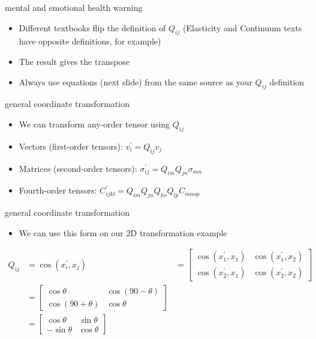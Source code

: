 \documentclass[
  letterpaper,
  ignorenonframetext,
  aspectratio=43,
  handout,
  12pt]{beamer}
\providecommand{\tightlist}{%
  \setlength{\itemsep}{0pt}\setlength{\parskip}{0pt}}
\providecommand{\tightlist}{%
\setlength{\itemsep}{0pt}\setlength{\parskip}{0pt}}
\begin{document}
\begin{frame}{mental and emotional health warning}
\protect\hypertarget{mental-and-emotional-health-warning}{}
\begin{itemize}
\tightlist
\item
  Different textbooks flip the definition of \(Q_{ij}\) (Elasticity and
  Continuum texts have opposite definitions, for example)
\item
  The result gives the transpose
\item
  Always use equations (next slide) from the same source as your
  \(Q_{ij}\) definition
\end{itemize}
\end{frame}

\begin{frame}{general coordinate transformation}
\protect\hypertarget{general-coordinate-transformation-1}{}
\begin{itemize}
\tightlist
\item
  We can transform any-order tensor using \(Q_{ij}\)
\item
  Vectors (first-order tensors): \(v_i^\prime = Q_{ij} v_j\)
\item
  Matrices (second-order tensors):
  \(\sigma_{ij}^\prime = Q_{im}Q_{jn} \sigma_{mn}\)
\item
  Fourth-order tensors:
  \(C_{ijkl}^\prime = Q_{im}Q_{jn}Q_{ko}Q_{lp} C_{mnop}\)
\end{itemize}
\end{frame}

\begin{frame}{general coordinate transformation}
\protect\hypertarget{general-coordinate-transformation-2}{}
\begin{itemize}
\tightlist
\item
  We can use this form on our 2D transformation example
\end{itemize}

\[\begin{aligned}
  Q_{ij} &= \cos (x_i^\prime, x_j)\ &=
  \begin{bmatrix}
  \cos (x_1^\prime, x_1) & \cos (x_1^\prime, x_2)\\
  \cos (x_2^\prime, x_1) & \cos (x_2^\prime, x_2)
  \end{bmatrix}\\
  &= \begin{bmatrix}
  \cos \theta & \cos (90-\theta)\\
  \cos (90+\theta) & \cos \theta
  \end{bmatrix} \\
  &= \begin{bmatrix}
  \cos \theta & \sin \theta \\
  -\sin \theta & \cos \theta
  \end{bmatrix}
\end{aligned}\]
\end{frame}
\end{document}
